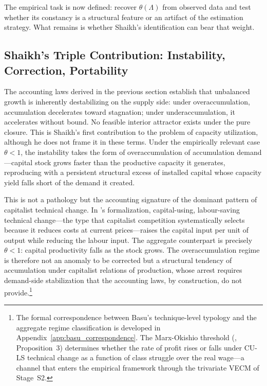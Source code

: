 The empirical task is now defined: recover $\theta(\Lambda)$ from observed data and test whether its constancy is a structural feature or an artifact of the estimation strategy. What remains is whether Shaikh's identification can bear that weight.



\subsection{Shaikh's Triple Contribution: Instability, Correction, Portability}
\label{sec:shaikh_triple}

The accounting laws derived in the previous section establish that unbalanced growth is inherently destabilizing on the supply side: under overaccumulation, accumulation decelerates toward stagnation; under underaccumulation, it accelerates without bound. No feasible interior attractor exists under the pure closure. This is Shaikh's first contribution to the problem of capacity utilization, although he does not frame it in these terms. Under the empirically relevant case $\theta < 1$, the instability takes the form of overaccumulation of accumulation demand---capital stock grows faster than the productive capacity it generates, reproducing with a persistent structural excess of installed capital whose capacity yield falls short of the demand it created.

This is not a pathology but the accounting signature of the dominant pattern of capitalist technical change. In \citet{Basu2022}'s formalization, capital-using, labour-saving technical change---the type that capitalist competition systematically selects because it reduces costs at current prices---raises the capital input per unit of output while reducing the labour input. The aggregate counterpart is precisely $\theta < 1$: capital productivity falls as the stock grows. The overaccumulation regime is therefore not an anomaly to be corrected but a structural tendency of accumulation under capitalist relations of production, whose arrest requires demand-side stabilization that the accounting laws, by construction, do not provide.\footnote{The formal correspondence between Basu's technique-level typology and the aggregate regime classification is developed in Appendix~\ref{app:basu_correspondence}. The Marx-Okishio threshold (\citealp{Basu2022}, Proposition~3) determines whether the rate of profit rises or falls under CU-LS technical change as a function of class struggle over the real wage---a channel that enters the empirical framework through the trivariate VECM of Stage~S2.}

